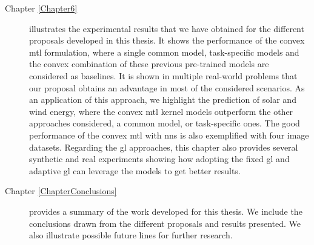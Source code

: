 \begin{description}
\item [{ Chapter \ref{Chapter6}}] illustrates the experimental results that we have obtained for the different proposals developed in this thesis. It shows the performance of the convex \acrshort{mtl} formulation, where a single common model, task-specific models and the convex combination of these previous pre-trained models are considered as baselines. It is shown in multiple real-world problems that our proposal obtains an advantage in most of the considered scenarios. As an application of this approach, we highlight the prediction of solar and wind energy, where the convex \acrshort{mtl} kernel models outperform the other approaches considered, a common model, or task-specific ones. The good performance of the convex \acrshort{mtl} with \acrshort{nns} is also exemplified with four image datasets. Regarding the \acrshort{gl} approaches, this chapter also provides several synthetic and real experiments showing how adopting the fixed \acrshort{gl} and adaptive \acrshort{gl} can leverage the models to get better results.

\item [{Chapter \ref{ChapterConclusions}}] provides a summary of the work developed for this thesis. We include the conclusions drawn from the different proposals and results presented. We also illustrate possible future lines for further research.

\end{description}


